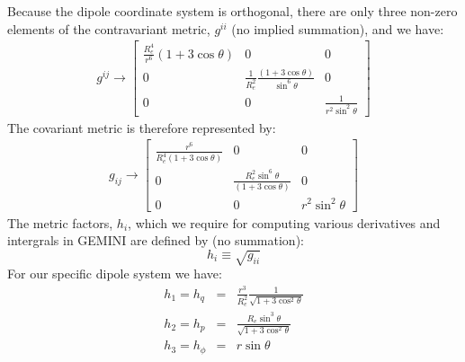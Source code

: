 \documentclass[11pt,letterpaper]{article}
\begin{document}
Because the dipole coordinate system is orthogonal, there are only three non-zero elements of the contravariant metric, $g^{ii}$ (no implied summation), and we have:
\begin{eqnarray}
g^{ij} \rightarrow \left[
\begin{array}{ccc}
\frac{R_e^4}{r^6} \left( 1 + 3 \cos \theta \right) & 0 & 0 \\ 
0 & \frac{1}{R_e^2} \frac{\left( 1+3 \cos \theta \right)}{\sin^6 \theta} & 0 \\
0 & 0 & \frac{1}{r^2 \sin^2 \theta}
\end{array}
\right] 
\end{eqnarray}
The covariant metric is therefore represented by:
\begin{eqnarray}
g_{ij} \rightarrow \left[
\begin{array}{ccc}
\frac{r^6}{R_e^4 \left( 1 + 3 \cos \theta \right)} & 0 & 0 \\ 
0 & \frac{R_e ^2 \sin^6 \theta}{\left( 1+3 \cos \theta \right)} & 0 \\
0 & 0 & r^2 \sin^2 \theta
\end{array}
\right] 
\end{eqnarray}
The metric factors, $h_i$, which we require for computing various derivatives and intergrals in GEMINI are defined by (no summation):
\begin{equation}
h_i \equiv \sqrt{g_{ii}}
\end{equation}
For our specific dipole system we have:  
\begin{eqnarray}
h_1 = h_q &=& \frac{r^3}{R_e^2} \frac{1}{\sqrt{1+3 \cos^2 \theta}} \\
h_2 = h_p &=& \frac{R_e \sin^3 \theta}{\sqrt{1+3 \cos^2 \theta}} \\
h_3 = h_\phi &=& r \sin \theta
\end{eqnarray}
\end{document}
